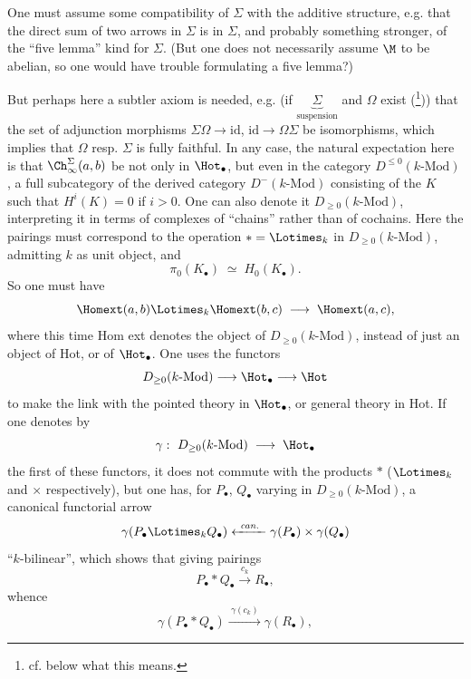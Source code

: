 One must assume some compatibility of $\Sigma$ with the additive structure, e.g. that the direct sum of two arrows in $\Sigma$ is in $\Sigma$, and probably something stronger, of the ``five lemma'' kind for $\Sigma$. (But one does not necessarily assume $\M$ to be abelian, so one would have trouble formulating a five lemma?) %


But perhaps here a subtler axiom is needed, e.g. (if $\underbrace{\Sigma}_{\text{suspension}}$ and $\Omega$ exist (\footnote[7]{cf. below what this means.})) that the set of adjunction morphisms $\Sigma\Omega \longrightarrow \mathrm{id}$, $\mathrm{id} \longrightarrow \Omega\Sigma$ be isomorphisms, which implies that $\Omega$ resp. $\Sigma$ is fully faithful. In any case, the natural expectation here is that $\Ch^{\Sigma}_{\infty}(a,b)$ be not only in $\Hot_{\bullet}$, but even in the category $D^{\leq 0}(k\text{-Mod})$, a full subcategory of the derived category $D^{-}(k\text{-Mod})$ consisting of the $K$ such that $H^{i}(K) = 0$ if $i > 0$. One can also denote it $D_{\geq 0}(k\text{-Mod})$, interpreting it in
terms of complexes of ``chains'' rather than of cochains. Here the pairings must correspond to the operation $* = \Lotimes_k$ in $D_{\geq 0}(k\text{-Mod})$, admitting $k$ as unit object, and
\[
\pi_0(K_{\bullet}) \;\simeq\; H_0(K_{\bullet}).
\]
So one must have
\[
\Homext(a,b) \Lotimes_k \Homext(b,c) \;\longrightarrow\; \Homext(a,c),
\]
where this time Hom ext denotes the object of $D_{\geq 0}(k\text{-Mod})$, instead of just an object of Hot, or of $\Hot_{\bullet}$. One uses the functors
\[
D_{\geq 0}(k\text{-Mod}) \longrightarrow \Hot_{\bullet} \longrightarrow \Hot
\]
to make the link with the pointed theory in $\Hot_{\bullet}$, or general theory in Hot. If one denotes by
\[
\gamma :\ D_{\geq 0}(k\text{-Mod}) \;\longrightarrow\; \Hot_{\bullet}
\]
the first of these functors, it does not commute with the products $*$ ($\Lotimes_k$ and $\times$ respectively), but one has, for $P_{\bullet}$, $Q_{\bullet}$ varying in $D_{\geq 0}(k\text{-Mod})$, a canonical functorial arrow %
\[
\gamma(P_{\bullet} \Lotimes_k Q_{\bullet}) \xleftarrow{\ \mathit{can.}\ } \gamma(P_{\bullet})\times\gamma(Q_{\bullet})
\]
``$k$-bilinear'', which shows that giving pairings
\[
P_{\bullet} * Q_{\bullet} \xrightarrow{\ c_k\ } R_{\bullet},
\]
whence
\[
\gamma(P_{\bullet} * Q_{\bullet}) \xrightarrow{\ \gamma(c_k)\ } \gamma(R_{\bullet}), \tag*{$(*)$}
\]
